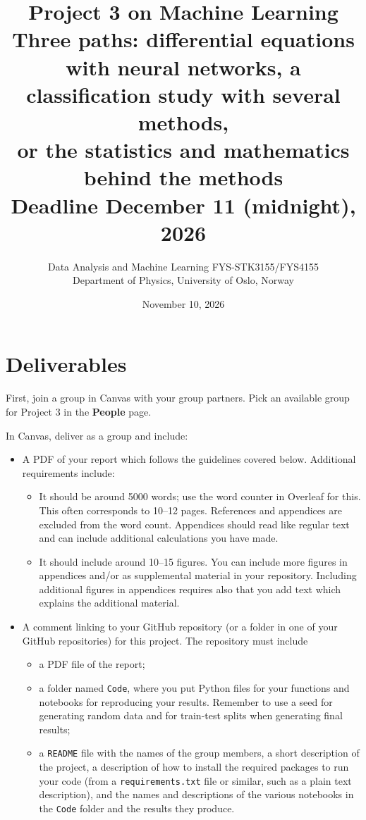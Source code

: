 \documentclass[11pt,a4paper]{article}
\title{Project 3 on Machine Learning\\[4pt]
  \large Three paths: differential equations with neural networks,
  a classification study with several methods,\\
  or the statistics and mathematics behind the methods\\[4pt]
  \normalsize Deadline December 11 (midnight), 2026}
\author{Data Analysis and Machine Learning FYS-STK3155/FYS4155\\
  Department of Physics, University of Oslo, Norway}
\date{November 10, 2026}
\begin{document}
\maketitle

\section*{Deliverables}

First, join a group in Canvas with your group partners.  Pick an available
group for Project 3 in the \textbf{People} page.

In Canvas, deliver as a group and include:
\begin{itemize}[nosep]
  \item A PDF of your report which follows the guidelines covered below.
        Additional requirements include:
  \begin{itemize}[nosep]
    \item It should be around 5000 words; use the word counter in Overleaf
          for this.  This often corresponds to 10--12 pages.  References and
          appendices are excluded from the word count.  Appendices should
          read like regular text and can include additional calculations you
          have made.
    \item It should include around 10--15 figures.  You can include more
          figures in appendices and/or as supplemental material in your
          repository.  Including additional figures in appendices requires
          also that you add text which explains the additional material.
  \end{itemize}
  \item A comment linking to your GitHub repository (or a folder in one of
        your GitHub repositories) for this project.  The repository must
        include
  \begin{itemize}[nosep]
    \item a PDF file of the report;
    \item a folder named \texttt{Code}, where you put Python files for your
          functions and notebooks for reproducing your results.  Remember to
          use a seed for generating random data and for train-test splits
          when generating final results;
    \item a \texttt{README} file with the names of the group members, a short
          description of the project, a description of how to install the
          required packages to run your code (from a
          \texttt{requirements.txt} file or similar, such as a plain text
          description), and the names and descriptions of the various
          notebooks in the \texttt{Code} folder and the results they produce.
  \end{itemize}
\end{itemize}
\end{document}

